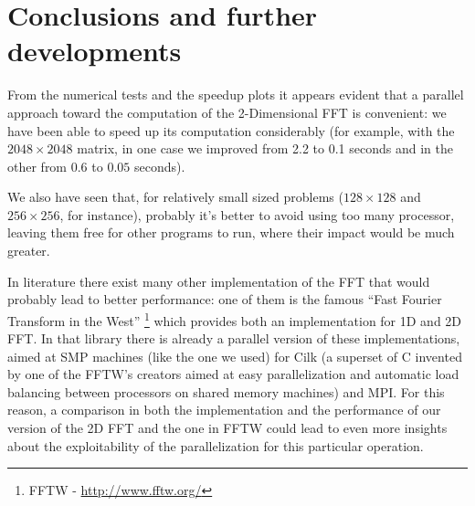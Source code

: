 \documentclass[a4paper,11pt]{article}
\begin{document}
\section{Conclusions and further developments}

From the numerical tests and the speedup plots it appears evident that a parallel approach toward the computation of the 2-Dimensional FFT is convenient: we have been able to speed up its computation considerably (for example, with the $2048 \times 2048$ matrix, in one case we improved from 2.2 to 0.1 seconds and in the other from $0.6$ to $0.05$ seconds).

We also have seen that, for relatively small sized problems ($128 \times 128$ and $256 \times 256$, for instance), probably it's better to avoid using too many processor, leaving them free for other programs to run, where their impact would be much greater.

In literature there exist many other implementation of the FFT that would probably lead to better performance: one of them is the famous ``Fast Fourier Transform in the West'' \footnote{FFTW - \url{http://www.fftw.org/}} which provides both an implementation for  1D and 2D FFT. In that library there is already a parallel version of these implementations, aimed at SMP machines (like the one we used) for Cilk (a superset of C invented by one of the FFTW's creators aimed at easy parallelization and automatic load balancing between processors on shared memory machines) and MPI. For this reason, a comparison in both the implementation and the performance of our version of the 2D FFT and the one in FFTW could lead to even more insights about the exploitability of the parallelization for this particular operation.

\printbibliography
\end{document}
